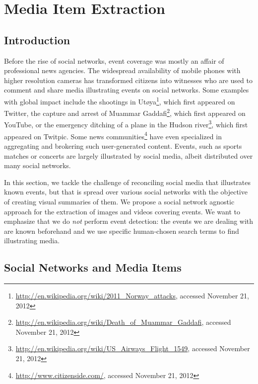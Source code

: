 \chapter{Media Item Extraction}

\ifpdf
    \graphicspath{{5_media_item_extraction/figures/PNG/}{5_media_item_extraction/figures/PDF/}{5_media_item_extraction/figures/}}
\else
    \graphicspath{{5_media_item_extraction/figures/EPS/}{5_media_item_extraction/figures/}}
\fi

\section{Introduction}
\label{sec:introduction}

Before the rise of social networks,
event coverage was mostly an affair of professional news agencies.
The widespread availability of mobile phones
with higher resolution cameras has transformed
citizens into witnesses who are used to comment
and share media illustrating events on social networks.
Some examples with global impact
include the shootings in
Ut{\o}ya\footnote{\url{http://en.wikipedia.org/wiki/2011_Norway_attacks},
accessed November 21, 2012},
which first appeared on Twitter,
the capture and arrest of Muammar
Gaddafi\footnote{\url{http://en.wikipedia.org/wiki/Death_of_Muammar_Gaddafi},
accessed November 21, 2012},
which first appeared on YouTube,
or the emergency ditching of a plane in the Hudson
river\footnote{\url{http://en.wikipedia.org/wiki/US_Airways_Flight_1549},
accessed November 21, 2012},
which first appeared on Twitpic.
Some news
communities\footnote{\url{http://www.citizenside.com/},
accessed November 21, 2012}
have even specialized in aggregating and brokering
such user-generated content.
Events, such as sports matches or concerts are 
largely illustrated by social media,
albeit distributed over many social networks.

In this section, we tackle the challenge of reconciling
social media that illustrates known events,
but that is spread over various social networks
with the objective of creating visual summaries of them.
We propose a social network agnostic
approach for the extraction of images and videos covering events. We want to emphasize that we do \emph{not} perform event detection: 
the events we are dealing with are known beforehand
and we use specific human-chosen search terms
to find illustrating media.

\section{Social Networks and Media Items}                                    \label{sec:social-networks}


